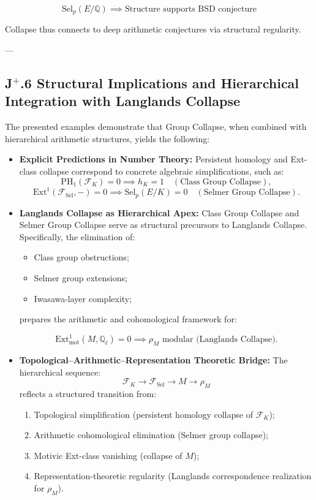 \documentclass[11pt]{article}
\begin{document}
\[
\mathrm{Sel}_p(E/\mathbb{Q}) \implies \text{Structure supports BSD conjecture}
\]

Collapse thus connects to deep arithmetic conjectures via structural regularity.

---

\subsection*{J$^{+}$.6 Structural Implications and Hierarchical Integration with Langlands Collapse}

The presented examples demonstrate that Group Collapse, when combined with hierarchical arithmetic structures, yields the following:

\begin{itemize}
    \item \textbf{Explicit Predictions in Number Theory:}  
    Persistent homology and Ext-class collapse correspond to concrete algebraic simplifications, such as:
    \[
    \mathrm{PH}_1(\mathcal{F}_K) = 0 \implies h_K = 1 \quad (\text{Class Group Collapse}),
    \]
    \[
    \mathrm{Ext}^1(\mathcal{F}_{\mathrm{Sel}}, -) = 0 \implies \mathrm{Sel}_p(E/K) = 0 \quad (\text{Selmer Group Collapse}).
    \]

    \item \textbf{Langlands Collapse as Hierarchical Apex:}  
    Class Group Collapse and Selmer Group Collapse serve as structural precursors to Langlands Collapse. Specifically, the elimination of:
    \begin{itemize}
        \item Class group obstructions;
        \item Selmer group extensions;
        \item Iwasawa-layer complexity;
    \end{itemize}
    prepares the arithmetic and cohomological framework for:

    \[
    \mathrm{Ext}^1_{\mathrm{mot}}(M, \mathbb{Q}_\ell) = 0 \implies \rho_M \text{ modular (Langlands Collapse)}.
    \]

    \item \textbf{Topological--Arithmetic--Representation Theoretic Bridge:}  
    The hierarchical sequence:
    \[
    \mathcal{F}_K \longrightarrow \mathcal{F}_{\mathrm{Sel}} \longrightarrow M \longrightarrow \rho_M
    \]
    reflects a structured transition from:

    \begin{enumerate}
        \item Topological simplification (persistent homology collapse of \( \mathcal{F}_K \));
        \item Arithmetic cohomological elimination (Selmer group collapse);
        \item Motivic Ext-class vanishing (collapse of \( M \));
        \item Representation-theoretic regularity (Langlands correspondence realization for \( \rho_M \)).
    \end{enumerate}


\end{itemize}
\end{document}
